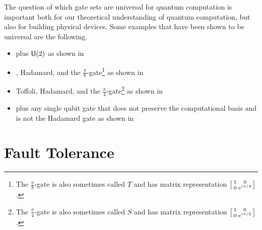 The question of which gate sets are universal for quantum computation is important both for our theoretical understanding of quantum computation, but also for building physical devices.
Some examples that have been shown to be universal are the following.
\begin{itemize}
    \item \CNOT{} plus $\mathsf{U} (2)$ as shown in~\cite{universal-cnot-u2}
    \item \CNOT{}, Hadamard, and the $\frac{\pi}{8}$-gate\footnote{The $\frac{\pi}{8}$-gate is also sometimes called $T$ and has matrix representation $\smqty[1 & 0 \\ 0 & \e^{\iu\pi/4}]$.} as shown in~\cite{universal-cnot-had-p8} %
    \item Toffoli, Hadamard, and the $\frac{\pi}{4}$-gate\footnote{The $\frac{\pi}{4}$-gate is also sometimes called $S$ and has matrix representation $\smqty[1 & 0 \\ 0 & \e^{\iu\pi/2}]$.} as shown in~\cite{bigkitaev}
    \item \CNOT{} plus any single qubit gate that does not preserve the computational basis and is not the Hadamard gate as shown in~\cite{universal-cnot-basis-change}
\end{itemize}

\section{Fault Tolerance}\label{sec:ft}

